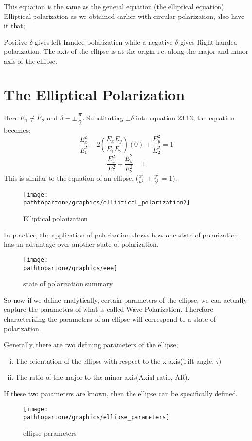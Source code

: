 This equation is the same as the general equation (the elliptical equation). Elliptical polarization as we obtained earlier with circular polarization, also have it that;

Positive $\delta$ gives left-handed polarization while a negative $\delta$ gives Right handed polarization. The axis of the ellipse is at the origin i.e. along the major and minor axis of the ellipse.

\section{The Elliptical Polarization}
Here $E_1\neq E_2$ and $\delta = \pm \dfrac{\pi}{2} $. Substituting $\pm \delta$ into equation 23.13, the equation becomes;
\begin{equation}
\frac{E_{x}^2}{E_{1}^2} -2(\frac{E_{x}E_{y}}{E_{1}E_{2}})(0) + \frac{E_{y}^2}{E_{2}^2} = 1
\end{equation}
\begin{equation}
\frac{E_{x}^2}{E_{1}^2} + \frac{E_{y}^2}{E_{2}^2} = 1
\end{equation}
This is similar to the equation of an ellipse, ($\frac{x^2}{a^2}$ + $\frac{y^2}{b^2}$ = 1).
\begin{figure}[h]
\centering
\texttt{[image: \\pathtopartone/graphics/elliptical\_polarization2]}
\caption{Elliptical polarization}
\end{figure}

In practice, the application of polarization shows how one state of polarization has an advantage over another state of polarization.
\begin{figure}[h]
\centering
\texttt{[image: \\pathtopartone/graphics/eee]}
\caption{state of polarization summary}
\end{figure}

So now if we define analytically, certain parameters of the ellipse, we can actually capture the parameters of what is called Wave Polarization. Therefore characterizing the parameters of an ellipse will correspond to a state of polarization.

Generally, there are two defining parameters of the ellipse;
\begin{enumerate}[(i)]
\item The orientation of the ellipse with respect to the x-axis(Tilt angle, $\tau$) 
\item The ratio of the major to the minor axis(Axial ratio, AR).
\end{enumerate}
If these two parameters are known, then the ellipse can be specifically defined.
\begin{figure}[h]
\centering
\texttt{[image: \\pathtopartone/graphics/ellipse\_parameters]}
\caption{ellipse parameters}
\end{figure}

